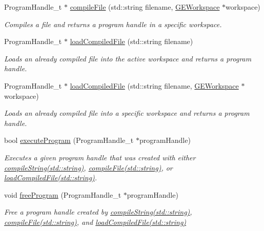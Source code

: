 \begin{DoxyCompactItemize}
Program\+Handle\+\_\+t $\ast$ \hyperlink{class_g_a_u_s_s_a85259cc52f5d47ebf79f33ab9e137ffa}{compile\+File} (std\+::string filename, \hyperlink{class_g_e_workspace}{G\+E\+Workspace} $\ast$workspace)
\begin{DoxyCompactList}\small\item\em Compiles a file and returns a program handle in a specific workspace. \end{DoxyCompactList}\item 
Program\+Handle\+\_\+t $\ast$ \hyperlink{class_g_a_u_s_s_a664d80b6f169ea22867b4a949d2fbc93}{load\+Compiled\+File} (std\+::string filename)
\begin{DoxyCompactList}\small\item\em Loads an already compiled file into the active workspace and returns a program handle. \end{DoxyCompactList}\item 
Program\+Handle\+\_\+t $\ast$ \hyperlink{class_g_a_u_s_s_aa0e49f43968782054817936c34ca6f79}{load\+Compiled\+File} (std\+::string filename, \hyperlink{class_g_e_workspace}{G\+E\+Workspace} $\ast$workspace)
\begin{DoxyCompactList}\small\item\em Loads an already compiled file into a specific workspace and returns a program handle. \end{DoxyCompactList}\item 
bool \hyperlink{class_g_a_u_s_s_a7fc9de69421c14aadb9a6310fecabcca}{execute\+Program} (Program\+Handle\+\_\+t $\ast$program\+Handle)
\begin{DoxyCompactList}\small\item\em Executes a given program handle that was created with either \hyperlink{class_g_a_u_s_s_a3ecf1522874c8ae5aa8fb8173d515b73}{compile\+String(std\+::string)}, \hyperlink{class_g_a_u_s_s_a981bdafede1af555a73b9abe05333341}{compile\+File(std\+::string)}, or \hyperlink{class_g_a_u_s_s_a664d80b6f169ea22867b4a949d2fbc93}{load\+Compiled\+File(std\+::string)}. \end{DoxyCompactList}\item 
void \hyperlink{class_g_a_u_s_s_a64c8cf4b564aea63ed8e771c969b8936}{free\+Program} (Program\+Handle\+\_\+t $\ast$program\+Handle)
\begin{DoxyCompactList}\small\item\em Free a program handle created by \hyperlink{class_g_a_u_s_s_a3ecf1522874c8ae5aa8fb8173d515b73}{compile\+String(std\+::string)}, \hyperlink{class_g_a_u_s_s_a981bdafede1af555a73b9abe05333341}{compile\+File(std\+::string)}, and \hyperlink{class_g_a_u_s_s_a664d80b6f169ea22867b4a949d2fbc93}{load\+Compiled\+File(std\+::string)} \end{DoxyCompactList}\item 

\end{DoxyCompactItemize}
